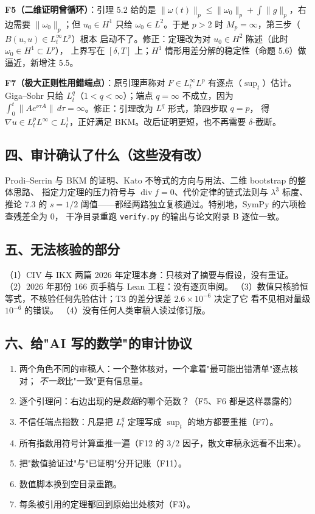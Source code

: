 \documentclass[11pt,a4paper]{article}
\begin{document}
\textbf{F5（二维证明曾循环）}：引理 5.2 给的是
$\|\omega(t)\|_p\le\|\omega_0\|_p+\int\|g\|_p$，右边需要 $\|\omega_0\|_p$；但 $u_0\in H^1$
只给 $\omega_0\in L^2$。于是 $p>2$ 时 $M_p=\infty$，第三步（$B(u,u)\in L^\infty_tL^p$）根本
启动不了。修正：定理改为对 $u_0\in H^2$ 陈述（此时 $\omega_0\in H^1\subset L^p$），
上界写在 $[\delta,T]$ 上；$H^1$ 情形用差分解的稳定性（命题 5.6）做逼近，新增注 5.5。

\textbf{F7（极大正则性用錯端点）}：原引理声称对 $F\in L^\infty_tL^p$ 有逐点（$\sup_t$）估计。
Giga--Sohr 只给 $L^q_t$（$1<q<\infty$）；端点 $q=\infty$ 不成立，因为
$\int_0^t\|Ae^{\nu\tau A}\|\,d\tau=\infty$。修正：引理改为 $L^q$ 形式，第四步取 $q=p$，
得 $\nabla u\in L^p_tL^\infty\subset L^1_t$，正好满足 BKM。改后证明更短，也不再需要
$\delta$-截断。

\subsection*{四、审计确认了什么（这些没有改）}

Prodi--Serrin 与 BKM 的证明、Kato 不等式的方向与用法、二维 bootstrap 的整体思路、
指定力定理的压力符号与 $\operatorname{div}f=0$、代价定律的链式法则与 $\lambda^3$ 标度、
推论 7.3 的 $s=1/2$ 阈值——都经两路独立复核通过。特别地，SymPy 的六项检查残差全为 0，
干净目录重跑 \texttt{verify.py} 的输出与论文附录 B 逐位一致。

\subsection*{五、无法核验的部分}

（1）CIV 与 IKX 两篇 2026 年定理本身：只核对了摘要与假设，没有重证。
（2）2026 年那份 166 页手稿与 Lean 工程：没有逐页审阅。
（3）数值只核验恒等式，不核验任何先验估计；T3 的差分误差 $2.6\times10^{-6}$ 决定了它
     看不见相对量级 $10^{-6}$ 的错误。
（4）没有任何人类审稿人读过修订版。

\subsection*{六、给"AI 写的数学"的审计协议}

\begin{enumerate}[label=\textbf{R\arabic*.},leftmargin=2.2em]
\item 两个角色不同的审稿人：一个整体核对，一个拿着"最可能出错清单"逐点核对；
      \emph{不一致}比"一致"更有信息量。
\item 逐个引理问：右边出现的是\emph{数据}的哪个范数？（F5、F6 都是这样暴露的）
\item 不信任端点指数：凡是把 $L^q_t$ 定理写成 $\sup_t$ 的地方都要重推（F7）。
\item 所有指数用符号计算重推一遍（F12 的 $3/2$ 因子，散文审稿永远看不出来）。
\item 把"数值验证过"与"已证明"分开记账（F11）。
\item 数值脚本换到空目录重跑。
\item 每条被引用的定理都回到原始出处核对（F3）。
\end{enumerate}
\end{document}
